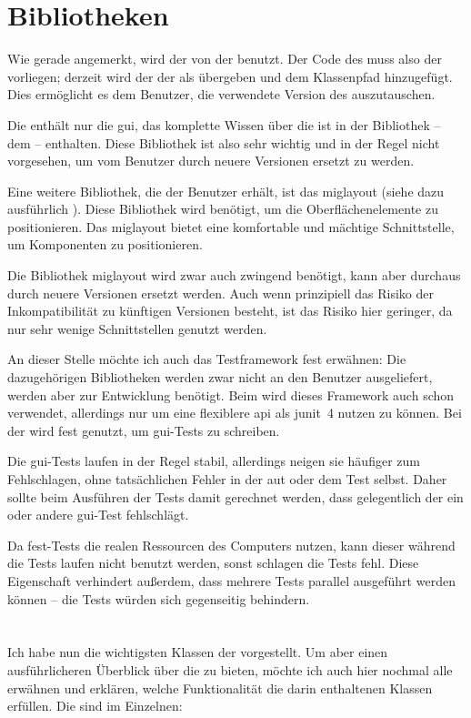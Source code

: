\section{Bibliotheken}
Wie gerade angemerkt, wird der \md von der \mdg benutzt. Der Code des \md muss also der \mdg vorliegen; derzeit wird der \md der \mdg als  übergeben und dem Klassenpfad hinzugefügt. Dies ermöglicht es dem Benutzer, die verwendete Version des \md auszutauschen.

Die \mdg enthält nur die \gls{gui}, das komplette Wissen über die \mic ist in der Bibliothek -- dem \md -- enthalten. Diese Bibliothek ist also sehr wichtig und in der Regel nicht vorgesehen, um vom Benutzer durch neuere Versionen ersetzt zu werden.

Eine weitere Bibliothek, die der Benutzer erhält, ist das miglayout (siehe dazu ausführlich \cite{Mig2011}). Diese Bibliothek wird benötigt, um die Oberflächenelemente zu positionieren. Das miglayout bietet eine komfortable und mächtige Schnittstelle, um Komponenten zu positionieren.

Die Bibliothek miglayout wird zwar auch zwingend benötigt, kann aber durchaus durch neuere Versionen ersetzt werden. Auch wenn prinzipiell das Risiko der Inkompatibilität zu künftigen Versionen besteht, ist das Risiko hier geringer, da nur sehr wenige Schnittstellen genutzt werden.

An dieser Stelle möchte ich auch das Testframework \gls{fest} erwähnen: Die dazugehörigen Bibliotheken werden zwar nicht an den Benutzer ausgeliefert, werden aber zur Entwicklung benötigt. Beim \md wird dieses Framework auch schon verwendet, allerdings nur um eine flexiblere \gls{api} als \gls{junit}~4 nutzen zu können. Bei der \mdg wird \gls{fest} genutzt, um \gls{gui}-Tests zu schreiben.

Die \gls{gui}-Tests laufen in der Regel stabil, allerdings neigen sie häufiger zum Fehlschlagen, ohne tatsächlichen Fehler in der \gls{aut} oder dem Test selbst. Daher sollte beim Ausführen der Tests damit gerechnet werden, dass gelegentlich der ein oder andere \gls{gui}-Test fehlschlägt.

Da \gls{fest}-Tests die realen Ressourcen des Computers nutzen, kann dieser während die Tests laufen nicht benutzt werden, sonst schlagen die Tests fehl. Diese Eigenschaft verhindert außerdem, dass mehrere Tests parallel ausgeführt werden können -- die Tests würden sich gegenseitig behindern. \cite[Abschnitt~3.2]{Roesch2011fest}

\section{\packages}
Ich habe nun die wichtigsten Klassen der \mdg vorgestellt. Um aber einen ausführlicheren Überblick über die \mdg zu bieten, möchte ich auch hier nochmal alle \packages erwähnen und erklären, welche Funktionalität die darin enthaltenen Klassen erfüllen. Die \packages sind im Einzelnen:

